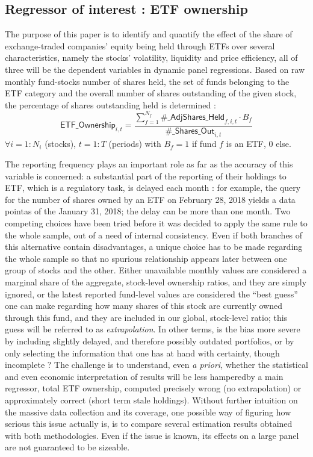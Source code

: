 \subsection{Regressor of interest : ETF ownership}
The purpose of this paper is to identify and quantify the effect of the share of exchange-traded companies' equity being held through ETFs over several characteristics, namely the stocks' volatility, liquidity and price efficiency, all of three will be the dependent variables in dynamic panel regressions. Based on raw monthly fund-stocks number of shares held, the set of funds belonging to the ETF category and the overall number of shares outstanding of the given stock, the percentage of shares outstanding held is determined :
\begin{equation}
  \mathsf{ETF\_Ownership}_{i, t} = \frac{\sum_{f = 1}^{N_{f}} \mathsf{\#\_AdjShares\_Held}_{f, i, t}\cdot B_{f}}{\mathsf{\#\_Shares\_Out}_{i, t}}
\end{equation}
$\forall i = 1:N_{i}$ (stocks), $t = 1:T$ (periods)
with $B_{f} = 1$ if fund $f$ is an ETF, $0$ else.

The reporting frequency plays an important role as far as the accuracy of this variable is concerned: a substantial part of the reporting of their holdings to ETF, which is a regulatory task, is delayed each month : for example, the query for the number of shares owned by an ETF on February 28, 2018 yields a data pointas of the January 31, 2018; the delay can be more than one month. Two competing choices have been tried before it was decided to apply the same rule to the whole sample, out of a need of internal consistency. Even if both branches of this alternative contain disadvantages, a unique choice has to be made regarding the whole sample so that no spurious relationship appears later between one group of stocks and the other. Either unavailable monthly values are considered a marginal share of the aggregate, stock-level ownership ratios, and they are simply ignored, or the latest reported fund-level values are considered the ``best guess'' one can make regarding how many shares of this stock are currently owned through this fund, and they are included in our global, stock-level ratio; this guess will be referred to as \textit{extrapolation}. In other terms, is the bias more severe by including slightly delayed, and therefore possibly outdated portfolios, or by only selecting the information that one has at hand with certainty, though incomplete ? The challenge is to understand, even \textit{a priori}, whether the statistical and even economic interpretation of results will be less hamperedby a main regressor, total ETF ownership, computed precisely wrong (no extrapolation) or approximately correct (short term stale holdings). Without further intuition on the massive data collection and its coverage, one possible way of figuring how serious this issue actually is, is to compare several estimation results obtained with both methodologies. Even if the issue is known, its effects on a large panel are not guaranteed to be sizeable. 

